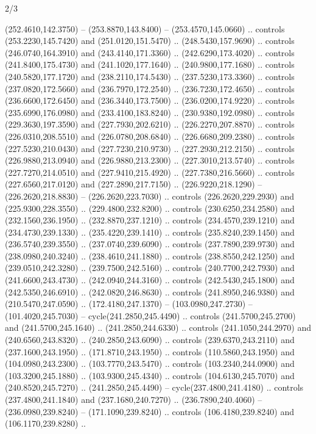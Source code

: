 \begin{flagdescription}{2/3}
\begin{scope}[xshift=0.5\flaglength,yshift=0.5\flagwidth,scale=\stretchfactor]
\begin{scope}[scale=0.001645\flagwidth,yshift=65mm,xshift=-63mm]
\begin{scope}[y=0.80pt, x=0.80pt, yscale=-1,]
\begin{scope}[cm={{1.33333,0.0,0.0,1.33333,(0.0,1e-05)}}]
  (252.4610,142.3750) -- (253.8870,143.8400) -- (253.4570,145.0660) .. controls
  (253.2230,145.7420) and (251.0120,151.5470) .. (248.5430,157.9690) .. controls
  (246.0740,164.3910) and (243.4140,171.3360) .. (242.6290,173.4020) .. controls
  (241.8400,175.4730) and (241.1020,177.1640) .. (240.9800,177.1680) .. controls
  (240.5820,177.1720) and (238.2110,174.5430) .. (237.5230,173.3360) .. controls
  (237.0820,172.5660) and (236.7970,172.2540) .. (236.7230,172.4650) .. controls
  (236.6600,172.6450) and (236.3440,173.7500) .. (236.0200,174.9220) .. controls
  (235.6990,176.0980) and (233.4100,183.8240) .. (230.9380,192.0980) .. controls
  (229.3630,197.3590) and (227.7930,202.6210) .. (226.2270,207.8870) .. controls
  (226.0310,208.5510) and (226.0780,208.6840) .. (226.6680,209.2380) .. controls
  (227.5230,210.0430) and (227.7230,210.9730) .. (227.2930,212.2150) .. controls
  (226.9880,213.0940) and (226.9880,213.2300) .. (227.3010,213.5740) .. controls
  (227.7270,214.0510) and (227.9410,215.4920) .. (227.7380,216.5660) .. controls
  (227.6560,217.0120) and (227.2890,217.7150) .. (226.9220,218.1290) --
  (226.2620,218.8830) -- (226.2620,223.7030) .. controls (226.2620,229.2930) and
  (225.9300,228.3550) .. (229.4800,232.8200) .. controls (230.6250,234.2580) and
  (232.1560,236.1950) .. (232.8870,237.1210) .. controls (234.4570,239.1210) and
  (234.4730,239.1330) .. (235.4220,239.1410) .. controls (235.8240,239.1450) and
  (236.5740,239.3550) .. (237.0740,239.6090) .. controls (237.7890,239.9730) and
  (238.0980,240.3240) .. (238.4610,241.1880) .. controls (238.8550,242.1250) and
  (239.0510,242.3280) .. (239.7500,242.5160) .. controls (240.7700,242.7930) and
  (241.6600,243.4730) .. (242.0940,244.3160) .. controls (242.5430,245.1800) and
  (242.5350,246.6910) .. (242.0820,246.8630) .. controls (241.8950,246.9380) and
  (210.5470,247.0590) .. (172.4180,247.1370) -- (103.0980,247.2730) --
  (101.4020,245.7030) -- cycle(241.2850,245.4490) .. controls
  (241.5700,245.2700) and (241.5700,245.1640) .. (241.2850,244.6330) .. controls
  (241.1050,244.2970) and (240.6560,243.8320) .. (240.2850,243.6090) .. controls
  (239.6370,243.2110) and (237.1600,243.1950) .. (171.8710,243.1950) .. controls
  (110.5860,243.1950) and (104.0980,243.2300) .. (103.7770,243.5470) .. controls
  (103.2340,244.0900) and (103.3200,245.1880) .. (103.9300,245.4340) .. controls
  (104.6130,245.7070) and (240.8520,245.7270) .. (241.2850,245.4490) --
  cycle(237.4800,241.4180) .. controls (237.4800,241.1840) and
  (237.1680,240.7270) .. (236.7890,240.4060) -- (236.0980,239.8240) --
  (171.1090,239.8240) .. controls (106.4180,239.8240) and (106.1170,239.8280) ..

\end{scope}
\end{scope}
\end{scope}
\end{scope}
\end{flagdescription}

